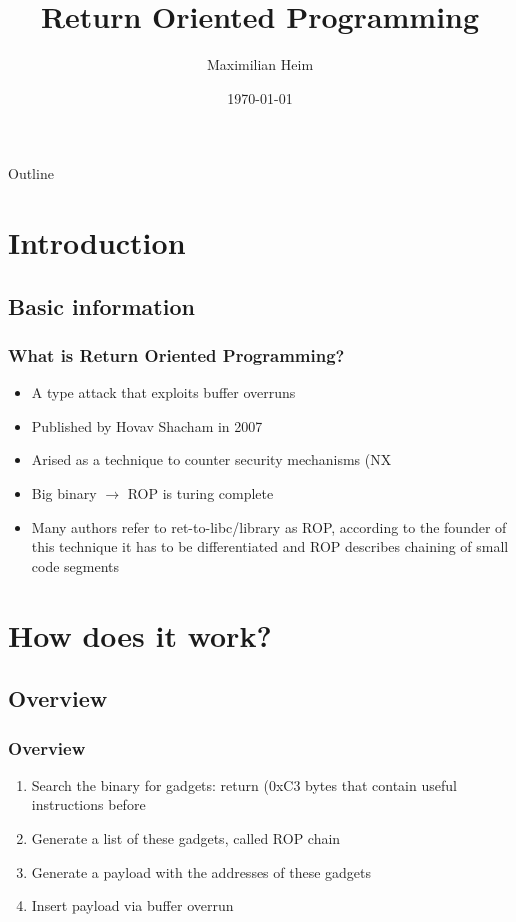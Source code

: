 \documentclass[11pt]{beamer}
\author{Maximilian Heim}
\title{Return Oriented Programming}
\institute{University Albstadt-Sigmaringen}
\date{\today}
\begin{document}
\begin{frame}
\titlepage
\end{frame}

\begin{frame}{Outline}
\tableofcontents
\end{frame}

\section{Introduction}
\subsection{Basic information}
\begin{frame}
    \frametitle{What is Return Oriented Programming?}
    \begin{itemize}
    \item A type attack that exploits buffer overruns
    \item Published by Hovav Shacham in 2007
    \item Arised as a technique to counter security mechanisms (NX\)\)
    \item Big binary $\rightarrow$ ROP is turing complete
    \item Many authors refer to ret-to-libc/library as ROP, according to the founder of this technique it has to be differentiated and ROP describes chaining of small code segments
    \end{itemize}
\end{frame}

\section{How does it work?}
\subsection{Overview}
\begin{frame}
    \frametitle{Overview}
    \begin{enumerate}
        \item Search the binary for gadgets: return (0xC3\)\) bytes that contain useful instructions before
        \item Generate a list of these gadgets, called ROP chain
        \item Generate a payload with the addresses of these gadgets
        \item Insert payload via buffer overrun
    \end{enumerate} 
\end{frame}
\end{document}

